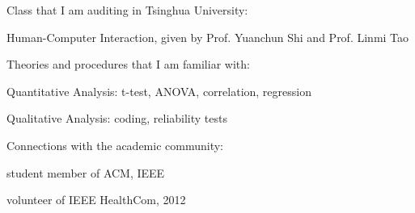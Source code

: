 \documentclass[margin,line]{resume}
\begin{document}
\begin{resume}
    Class that I am auditing in Tsinghua University:
    \begin{list2}
    \item Human-Computer Interaction, given by Prof. Yuanchun Shi and Prof. Linmi Tao
    \end{list2}
    
    Theories and procedures that I am familiar with:
    \begin{list2}
    \item Quantitative Analysis: t-test, ANOVA, correlation, regression
    \item Qualitative Analysis: coding, reliability tests
    \end{list2}
    
    Connections with the academic community:
    \begin{list2}
    \item student member of ACM, IEEE
    \item volunteer of IEEE HealthCom, 2012
    \end{list2}
    

\end{resume}
\end{document}
